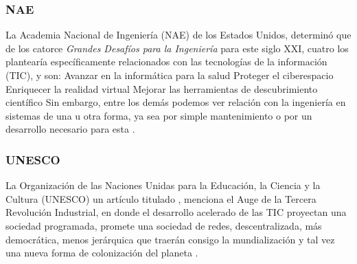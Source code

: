 \subsubsection{NAE}
La Academia Nacional de Ingeniería (NAE) de los Estados Unidos, determinó que de los catorce \textit{Grandes Desafíos para la Ingeniería} para este siglo XXI, cuatro los plantearía específicamente relacionados con las tecnologías de la información (TIC), y son: 
Avanzar en la informática para la salud 
Proteger el ciberespacio 
Enriquecer la realidad virtual 
Mejorar las herramientas de descubrimiento científico
Sin embargo, entre los demás podemos ver relación con la ingeniería en sistemas de una u otra forma, ya sea por simple mantenimiento o por un desarrollo necesario para esta \cite{nae:2008}.

\subsubsection{UNESCO}
La Organización de las Naciones Unidas para la Educación, la Ciencia y la Cultura (UNESCO) un artículo titulado , menciona el Auge de la Tercera Revolución Industrial, en donde el desarrollo acelerado de las TIC proyectan una sociedad programada, promete una sociedad de redes, descentralizada, más democrática, menos jerárquica que traerán consigo la mundialización y tal vez una nueva forma de colonización del planeta \cite{unesco:2002}. 

